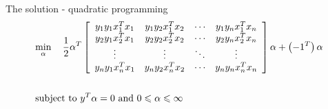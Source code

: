 \begin{frame}{The solution - quadratic programming}
\[\begin{gathered}
  \mathop {\min }\limits_\alpha ~~~ \frac{1}{2}{\alpha ^T}\left[ {\begin{array}{*{20}{c}}
  {{y_1}{y_1}x_1^T{x_1}}&{{y_1}{y_2}x_1^T{x_2}}&{\cdots}&{{y_1}{y_n}x_1^T{x_n}} \\ 
  {{y_2}{y_1}x_2^T{x_1}}&{{y_2}{y_2}x_2^T{x_2}}&{\cdots}&{{y_2}{y_n}x_2^T{x_n}} \\ 
  {\vdots}&{\vdots}&{\ddots}&{\vdots} \\ 
  {{y_n}{y_1}x_n^T{x_1}}&{{y_n}{y_2}x_n^T{x_2}}&{\cdots}&{{y_n}{y_n}x_n^T{x_n}} 
\end{array}} \right]\alpha  + \left( { - {1^T}} \right)\alpha  \hfill \\\\
  \text{subject to   }{y^T}\alpha  = 0\text{   and   }0 \leqslant \alpha  \leqslant \infty  \hfill \\ 
\end{gathered} \]
\end{frame}


